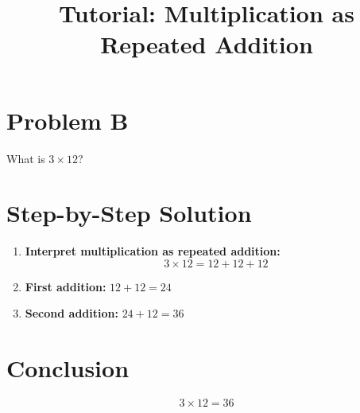 \documentclass{article}
\begin{document}
\title{Tutorial: Multiplication as Repeated Addition}
\date{}
\maketitle

\section*{Problem B}
What is $3 \times 12$?

\section*{Step-by-Step Solution}
\begin{enumerate}[label=Step \arabic*:, leftmargin=*]
    \item \textbf{Interpret multiplication as repeated addition:}
          \[
              3 \times 12 = 12 + 12 + 12
          \]

    \item \textbf{First addition:} $12 + 12 = 24$

    \item \textbf{Second addition:} $24 + 12 = 36$
\end{enumerate}

\section*{Conclusion}
\[
    3 \times 12 = 36
\]
\end{document}
